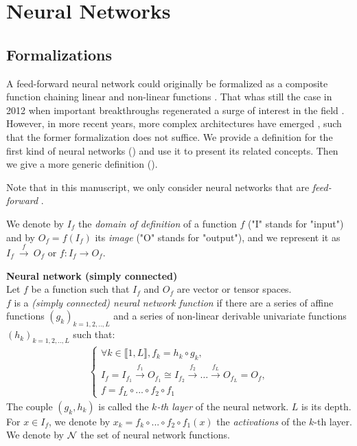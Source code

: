 \section{Neural Networks}
\label{sec:nn}

\subsection{Formalizations}

A feed-forward neural network could originally be formalized as a composite function chaining linear and non-linear functions \citep{rumelhart1985learning,lecun1989backpropagation,lecun1995convolutional}. That whas still the case in 2012 when important breakthroughs regenerated a surge of interest in the field \citep{hinton2012deep,krizhevsky2012imagenet,simonyan2014very}. However, in more recent years, more complex architectures have emerged \citep{szegedy2015going,he2016deep,zoph2016neural,huang2017densely}, such that the former formalization does not suffice. We provide a definition for the first kind of neural networks () and use it to present its related concepts. Then we give a more generic definition ().

Note that in this manuscript, we only consider neural networks that are \emph{feed-forward} \citep{zell1994simulation, wiki:fnn}.

We denote by $I_f$ the \textit{domain of definition} of a function $f$ ("I" stands for "input") and by $O_f = f(I_f)$ its \textit{image} ("O" stands for "output"), and we represent it as $I_f~\xrightarrow{f}~O_f$ or $f: I_f \to O_f$.

\begin{definition}\textbf{Neural network (simply connected)}\\
Let $f$ be a function such that $I_f$ and $O_f$ are vector or tensor spaces.\\
$f$ is a \emph{(simply connected) neural network function} if there are a series of affine functions $(g_k)_{k=1,2,..,L}$ and a series of non-linear derivable univariate functions $(h_k)_{k=1,2,..,L}$ such that:
\begin{gather*}
\left\{
  \begin{array}{l}
    \forall k \in \llbracket 1, L \rrbracket, f_k = h_k \circ g_k, \\
    I_f = I_{f_1} \xrightarrow{f_1} O_{f_1} \cong I_{f_2} \xrightarrow{f_2} \dots \xrightarrow{f_L} O_{f_L} = O_f, \\
    f = f_{L} \circ ... \circ f_{2} \circ f_1
  \end{array}
\right.
\end{gather*}
The couple $(g_k, h_k)$ is called the \emph{$k$-th layer} of the neural network. $L$ is its depth.
For $x \in I_f$, we denote by $x_k = f_k \circ ... \circ f_{2} \circ f_1 (x)$ the \emph{activations} of the $k$-th layer. We denote by $\mathcal{N}$ the set of neural network functions.
\label{def:nn}
\end{definition}

